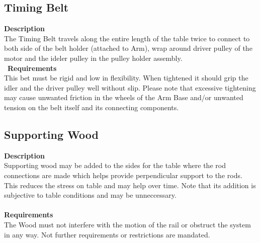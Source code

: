 \documentclass[titlepage]{article}
\begin{document}

\subsection{Timing Belt}
\textbf{Description}\\
The Timing Belt travels along the entire length of the table twice to connect to both side of the belt holder (attached to Arm), wrap around driver pulley of the motor and the ideler pulley in the pulley holder assembly.\\\
\textbf{Requirements}\\
This bet must be rigid and low in flexibility. When tightened it should grip the idler and the driver pulley well without slip. Please note that excessive tightening may cause unwanted friction in the wheels of the Arm Base and/or unwanted tension on the belt itself and its connecting components.


\subsection{Supporting Wood}
\textbf{Description}\\
Supporting wood may be added to the sides for the table where the rod connections are made which helps provide perpendicular support to the rods. This reduces the stress on table and may help over time. Note that its addition is subjective to table conditions and may be unneccessary.
\\~\\
\textbf{Requirements}\\
The Wood must not interfere with the motion of the rail or obstruct the system in any way. Not further requirements or restrictions are mandated.





\newpage
\end{document}
